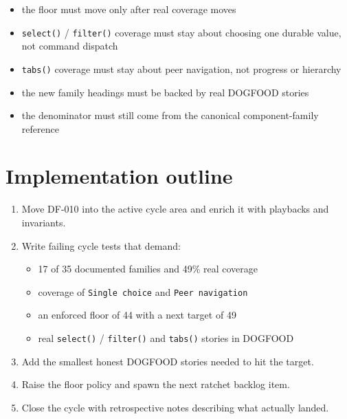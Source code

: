 \begin{itemize}
\tightlist
\item
  the floor must move only after real coverage moves
\item
  \texttt{s\allowbreak{}e\allowbreak{}l\allowbreak{}e\allowbreak{}c\allowbreak{}t\allowbreak{}(\allowbreak{})} / \texttt{f\allowbreak{}i\allowbreak{}l\allowbreak{}t\allowbreak{}e\allowbreak{}r\allowbreak{}(\allowbreak{})} coverage must stay about choosing one durable value, not command dispatch
\item
  \texttt{t\allowbreak{}a\allowbreak{}b\allowbreak{}s\allowbreak{}(\allowbreak{})} coverage must stay about peer navigation, not progress or hierarchy
\item
  the new family headings must be backed by real DOGFOOD stories
\item
  the denominator must still come from the canonical component-family reference
\end{itemize}

\section{Implementation outline}\label{record-072-implementation-outline}

\begin{enumerate}
\def\labelenumi{\arabic{enumi}.}
\tightlist
\item
  Move DF-010 into the active cycle area and enrich it with playbacks and invariants.
\item
  Write failing cycle tests that demand:

  \begin{itemize}
  \tightlist
  \item
    17 of 35 documented families and 49\% real coverage
  \item
    coverage of \texttt{S\allowbreak{}i\allowbreak{}n\allowbreak{}g\allowbreak{}l\allowbreak{}e\allowbreak{} \allowbreak{}c\allowbreak{}h\allowbreak{}o\allowbreak{}i\allowbreak{}c\allowbreak{}e} and \texttt{P\allowbreak{}e\allowbreak{}e\allowbreak{}r\allowbreak{} \allowbreak{}n\allowbreak{}a\allowbreak{}v\allowbreak{}i\allowbreak{}g\allowbreak{}a\allowbreak{}t\allowbreak{}i\allowbreak{}o\allowbreak{}n}
  \item
    an enforced floor of 44 with a next target of 49
  \item
    real \texttt{s\allowbreak{}e\allowbreak{}l\allowbreak{}e\allowbreak{}c\allowbreak{}t\allowbreak{}(\allowbreak{})} / \texttt{f\allowbreak{}i\allowbreak{}l\allowbreak{}t\allowbreak{}e\allowbreak{}r\allowbreak{}(\allowbreak{})} and \texttt{t\allowbreak{}a\allowbreak{}b\allowbreak{}s\allowbreak{}(\allowbreak{})} stories in DOGFOOD
  \end{itemize}
\item
  Add the smallest honest DOGFOOD stories needed to hit the target.
\item
  Raise the floor policy and spawn the next ratchet backlog item.
\item
  Close the cycle with retrospective notes describing what actually landed.
\end{enumerate}

